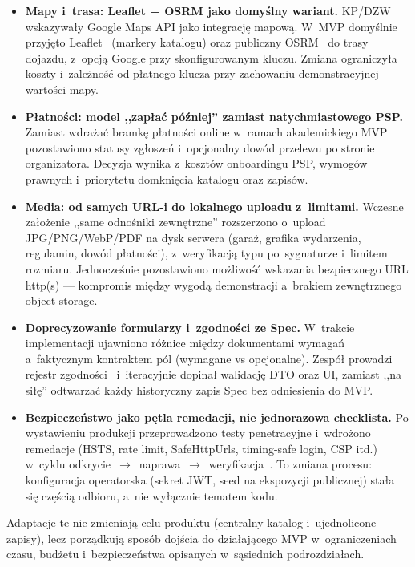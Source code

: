 \documentclass{sprz}
\begin{document}
\begin{itemize}
  \item \textbf{Mapy i~trasa: Leaflet + OSRM jako domyślny wariant.}
  KP/DZW wskazywały Google Maps API jako integrację mapową. W~MVP domyślnie przyjęto Leaflet~\cite{leaflet:docs} (markery katalogu) oraz publiczny OSRM~\cite{osrm:project} do trasy dojazdu, z~opcją Google przy skonfigurowanym kluczu. Zmiana ograniczyła koszty i~zależność od płatnego klucza przy zachowaniu demonstracyjnej wartości mapy.

  \item \textbf{Płatności: model ,,zapłać później'' zamiast natychmiastowego PSP.}
  Zamiast wdrażać bramkę płatności online w~ramach akademickiego MVP pozostawiono statusy zgłoszeń i~opcjonalny dowód przelewu po stronie organizatora. Decyzja wynika z~kosztów onboardingu PSP, wymogów prawnych i~priorytetu domknięcia katalogu oraz zapisów.

  \item \textbf{Media: od samych URL-i do lokalnego uploadu z~limitami.}
  Wczesne założenie ,,same odnośniki zewnętrzne'' rozszerzono o~upload JPG/PNG/WebP/PDF na dysk serwera (garaż, grafika wydarzenia, regulamin, dowód płatności), z~weryfikacją typu po~sygnaturze i~limitem rozmiaru. Jednocześnie pozostawiono możliwość wskazania bezpiecznego URL http(s) --- kompromis między wygodą demonstracji a~brakiem zewnętrznego object storage.

  \item \textbf{Doprecyzowanie formularzy i~zgodności ze Spec.}
  W~trakcie implementacji ujawniono różnice między dokumentami wymagań a~faktycznym kontraktem pól (wymagane vs opcjonalne). Zespół prowadzi rejestr zgodności~\cite{raceportal:spec} i~iteracyjnie dopinał walidację DTO oraz UI, zamiast ,,na siłę'' odtwarzać każdy historyczny zapis Spec bez odniesienia do MVP.

  \item \textbf{Bezpieczeństwo jako pętla remedacji, nie jednorazowa checklista.}
  Po wystawieniu produkcji przeprowadzono testy penetracyjne i~wdrożono remedacje (HSTS, rate limit, SafeHttpUrls, timing-safe login, CSP itd.) w~cyklu odkrycie~$\rightarrow$~naprawa~$\rightarrow$~weryfikacja~\cite{raceportal:pentest}. To zmiana procesu: konfiguracja operatorska (sekret JWT, seed na ekspozycji publicznej) stała się częścią odbioru, a~nie wyłącznie tematem kodu.
\end{itemize}

Adaptacje te nie zmieniają celu produktu (centralny katalog i~ujednolicone zapisy), lecz porządkują sposób dojścia do działającego MVP w~ograniczeniach czasu, budżetu i~bezpieczeństwa opisanych w~sąsiednich podrozdziałach.
\end{document}
